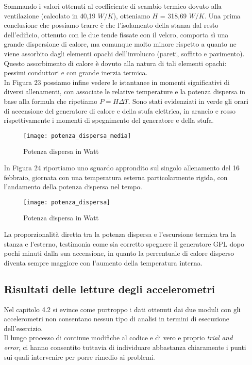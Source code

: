 \documentclass[fleqn,10pt]{SelfArx} %
\begin{document}
Sommando i valori ottenuti al coefficiente di scambio termico dovuto alla ventilazione (calcolato in 40,19 $ W/K $), otteniamo 
$ H $ = 318,69 $ W/K $.
Una prima conclusione che possiamo trarre è che l'isolamento della stanza dal resto dell'edificio, ottenuto con le due tende 
fissate con il velcro, comporta sì una grande dispersione di calore, ma comunque molto minore rispetto a quanto ne viene 
assorbito dagli elementi opachi dell'involucro (pareti, soffitto e pavimento). Questo assorbimento di calore è dovuto alla natura 
di tali elementi opachi: pessimi conduttori e con grande inerzia termica.\\

In Figura 23 possiamo infine vedere le istantanee in momenti significativi di diversi allenamenti, con associate le relative 
temperature e la potenza dispersa in base alla formula che ripetiamo $ P = H \Delta T $. Sono stati evidenziati in verde gli orari 
di accensione del generatore di calore e della stufa elettrica, in arancio e rosso rispettivamente i momenti di spegnimento del 
generatore e della stufa.

\begin{figure}[htb]\centering
	\texttt{[image: potenza\_dispersa\_media]}
	\caption{Potenza dispersa in Watt}
	\label{fig:potenza media dispersa}
\end{figure}

In Figura 24 riportiamo uno sguardo approndito sul singolo allenamento del 16 febbraio, giornata con una temperatura esterna 
particolarmente rigida, con l'andamento della potenza dispersa nel tempo.

\begin{figure}[htb]\centering
	\texttt{[image: potenza\_dispersa]}
	\caption{Potenza dispersa in Watt}
	\label{fig:potenza media dispersa}
\end{figure}

La proporzionalità diretta tra la potenza dispersa e l'escursione termica tra la stanza e l'esterno, testimonia come sia 
corretto spegnere il generatore GPL dopo pochi minuti dalla sua accensione, in quanto la percentuale di calore disperso diventa 
sempre maggiore con l'aumento della temperatura interna.

\subsection{Risultati delle letture degli accelerometri}
Nel capitolo 4.2 si evince come purtroppo i dati ottenuti dai due moduli con gli accelerometri non consentano nessun tipo di 
analisi in termini di esecuzione dell'esercizio.\\
Il lungo processo di continue modifiche al codice e di vero e proprio \textit{trial and error}, ci hanno consentito tuttavia 
di individuare abbastanza chiaramente i punti sui quali intervenire per porre rimedio ai problemi.
\end{document}
